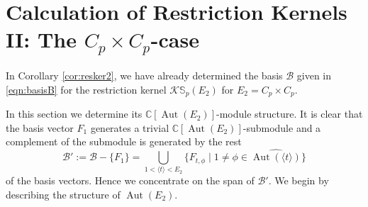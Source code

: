 \documentclass[12pt]{article}
\theoremstyle{plain}
\theoremstyle{definition}
\newcommand{\kerlin}{\mathbb S_p}
\newcommand{\Aut}{\operatorname{Aut}}
\begin{document}
\section{Calculation of Restriction Kernels II: The $C_p\times C_p$-case}\label{sec:restker2}

In Corollary \ref{cor:resker2}, we have already determined the basis $\mathcal B$ given in \ref{eqn:basisB} for the restriction kernel $\mathcal{K}\kerlin(E_2)$ for $E_2 = C_p\times C_p$.

In this section we determine its $\mathbb C[\Aut(E_2)]$-module structure. It is clear that the basis vector $F_1$ generates a trivial $\mathbb C[\Aut(E_2)]$-submodule and a complement of the submodule is generated by the rest
\[
\mathcal B':= \mathcal B - \{F_1\} = \bigcup_{1<\langle t\rangle < E_2} \{ F_{t, \phi}\mid 1\not =\phi\in\widehat{\Aut(\langle t\rangle)}\}
\]
of the basis vectors. Hence we concentrate on the span of $\mathcal{B}'$. We begin by describing the structure of $\Aut(E_2)$.
\end{document}

